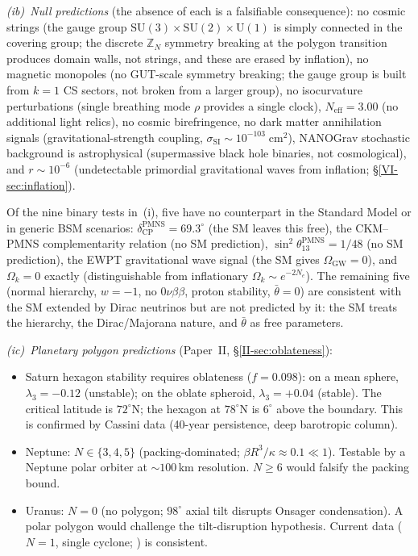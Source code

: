 \emph{(i\hspace{0.5pt}b)~Null predictions}
(the absence of each is a falsifiable consequence):
no cosmic strings
(the gauge group $\mathrm{SU}(3) \times \mathrm{SU}(2) \times \mathrm{U}(1)$
is simply connected in the covering group; the discrete
$\mathbb{Z}_N$ symmetry breaking at the polygon transition
produces domain walls, not strings, and these are erased by
inflation),
no magnetic monopoles
(no GUT-scale symmetry breaking; the gauge group
is built from $k = 1$ CS sectors, not broken from a
larger group),
no isocurvature perturbations (single breathing mode
$\rho$ provides a single clock),
$N_{\mathrm{eff}} = 3.00$ (no additional light relics),
no cosmic birefringence,
no dark matter annihilation signals
(gravitational-strength coupling,
$\sigma_{\mathrm{SI}} \sim 10^{-103}\;\mathrm{cm^2}$),
NANOGrav stochastic background is astrophysical
(supermassive black hole binaries, not cosmological),
and $r \sim 10^{-6}$ (undetectable primordial gravitational
waves from inflation; \S\ref{VI-sec:inflation}).

Of the nine binary tests in~(i), five have no counterpart
in the Standard Model or in generic BSM scenarios:
$\delta_{\mathrm{CP}}^{\mathrm{PMNS}} = 69.3^\circ$
(the SM leaves this free),
the CKM--PMNS complementarity relation
(no SM prediction),
$\sin^2\theta_{13}^{\mathrm{PMNS}} = 1/48$
(no SM prediction),
the EWPT gravitational wave signal
(the SM gives $\Omega_{\mathrm{GW}} = 0$),
and $\Omega_k = 0$ exactly
(distinguishable from inflationary
$\Omega_k \sim e^{-2N_e}$).
The remaining five (normal hierarchy, $w = -1$,
no $0\nu\beta\beta$, proton stability, $\bar\theta = 0$)
are consistent with the SM extended by Dirac neutrinos
but are not predicted by it:
the SM treats the hierarchy, the Dirac/Majorana nature,
and $\bar\theta$ as free parameters.

\emph{(i\hspace{0.5pt}c)~Planetary polygon predictions}
(Paper~II, \S\ref*{II-sec:oblateness}):
\begin{itemize}
\item Saturn hexagon stability requires oblateness
  ($f = 0.098$): on a mean sphere, $\lambda_3 = -0.12$
  (unstable); on the oblate spheroid, $\lambda_3 = +0.04$
  (stable).
  The critical latitude is $72^\circ$N; the hexagon
  at $78^\circ$N is $6^\circ$ above the boundary.
  This is confirmed by Cassini data (40-year persistence,
  deep barotropic column).
\item Neptune: $N \in \{3, 4, 5\}$ (packing-dominated;
  $\beta R^3/\kappa \approx 0.1 \ll 1$).
  Testable by a Neptune polar orbiter at $\sim 100$\,km
  resolution.
  $N \ge 6$ would falsify the packing bound.
\item Uranus: $N = 0$ (no polygon; $98^\circ$ axial tilt
  disrupts Onsager condensation).
  A polar polygon would challenge the tilt-disruption
  hypothesis.
  Current data ($N = 1$, single cyclone;
  \citealt{Akins2023}) is consistent.
\end{itemize}

